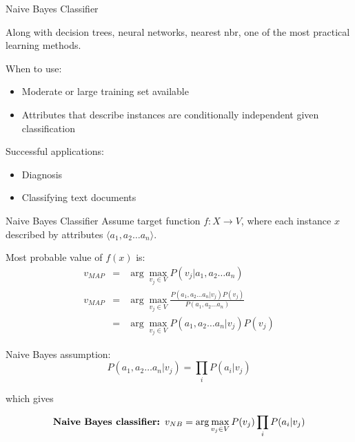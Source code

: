 \documentclass[%
pdf,
colorBG,
slideColor,
tcrico,
]{prosper}
\begin{document}

\begin{slide}{ Naive Bayes Classifier   }  

Along with decision trees, neural networks, nearest nbr, one of the most
practical learning methods.

When to use:
\begin{itemize}
\item Moderate or large training set available
\item Attributes that describe instances are conditionally independent given
classification 
\end{itemize}

Successful applications:
\begin{itemize}
\item Diagnosis
\item Classifying text documents
\end{itemize}
\end{slide}


\begin{slide}{ Naive Bayes Classifier   }  
\tiny
Assume target function $f: X \to V$, where each instance $x$ described by
attributes $\langle a_{1}, a_{2} \ldots a_{n} \rangle$.  

Most probable value of $f(x)$ is:
\begin{eqnarray}
v_{MAP} &= &\arg\max_{v_{j} \in V} P(v_{j} | a_{1}, a_{2} \ldots a_{n})  \nonumber \\ 
v_{MAP} &= &\arg\max_{v_{j} \in V} \frac{P(a_{1}, a_{2} \ldots a_{n}|v_{j})
P(v_{j})}{P(a_{1}, a_{2} \ldots a_{n})} \nonumber \\ 
&= &\arg\max_{v_{j} \in V} P(a_{1}, a_{2} \ldots a_{n}|v_{j}) P(v_{j}) \nonumber
\end{eqnarray}

Naive Bayes assumption:
\[ P(a_{1}, a_{2} \ldots a_{n}|v_{j}) = \prod_{i} P(a_{i} | v_{j}) \]

which gives 

\[\mbox{\bf Naive Bayes classifier: } v_{NB} = \arg\max_{v_{j} \in V} P(v_{j})
\prod_{i} P(a_{i} | v_{j}) \]
\end{slide}

\end{document}
